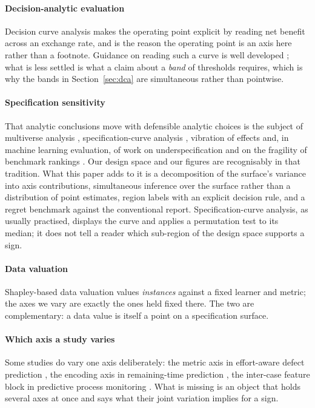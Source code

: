 \paragraph{Decision-analytic evaluation}
Decision curve analysis \citep{vickers2006dca,vickers2016net} makes the
operating point explicit by reading net benefit across an exchange rate, and
is the reason the operating point is an axis here rather than a footnote.
Guidance on reading such a curve is well developed \citep{vickers2019simple};
what is less settled is what a claim about a \emph{band} of thresholds
requires, which is why the bands in Section~\ref{sec:dca} are simultaneous
rather than pointwise.

\paragraph{Specification sensitivity}
That analytic conclusions move with defensible analytic choices is the subject
of multiverse analysis \citep{steegen2016increasing}, specification-curve
analysis \citep{simonsohn2020specification}, vibration of effects
\citep{patel2015assessment} and, in machine learning evaluation, of work on
underspecification \citep{damour2022underspecification} and on the fragility
of benchmark rankings \citep{bouthillier2021variance}. Our design space and
our figures are recognisably in that tradition. What this paper adds to it is
a decomposition of the surface's variance into axis contributions,
simultaneous inference over the surface rather than a distribution of point
estimates, region labels with an explicit decision rule, and a regret
benchmark against the conventional report. Specification-curve analysis, as
usually practised, displays the curve and applies a permutation test to its
median; it does not tell a reader which sub-region of the design space
supports a sign.

\paragraph{Data valuation}
Shapley-based data valuation \citep{ghorbani2019data,jia2019towards} values
\emph{instances} against a fixed learner and metric; the axes we vary are
exactly the ones held fixed there. The two are complementary: a data value is
itself a point on a specification surface.

\paragraph{Which axis a study varies}
Some studies do vary one axis deliberately: the metric axis in effort-aware
defect prediction \citep{carka2022effortaware}, the encoding axis in
remaining-time prediction \citep{liu2025encoding}, the inter-case feature
block in predictive process monitoring \citep{senderovich2017intercase}. What
is missing is an object that holds several axes at once and says what their
joint variation implies for a sign.

